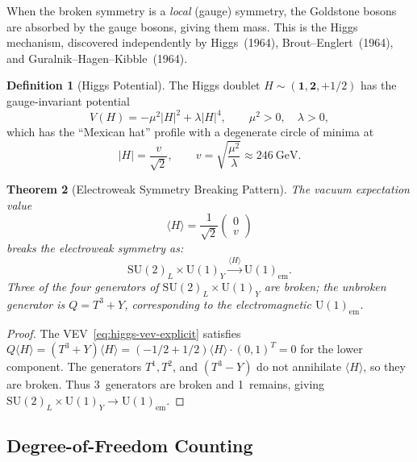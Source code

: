 \documentclass[12pt]{article}
\newtheorem{theorem}{Theorem}[section]
\theoremstyle{definition}
\newtheorem{definition}[theorem]{Definition}
\theoremstyle{remark}
\newcommand{\su}[1]{\mathrm{SU}(#1)}
\newcommand{\uu}[1]{\mathrm{U}(#1)}
\newcommand{\vev}[1]{\langle #1 \rangle}
\begin{document}
When the broken symmetry is a \emph{local} (gauge) symmetry, the Goldstone bosons are absorbed by the gauge bosons, giving them mass. This is the Higgs mechanism, discovered independently by Higgs~(1964), Brout--Englert~(1964), and Guralnik--Hagen--Kibble~(1964).

\begin{definition}[Higgs Potential]
\label{def:higgs-potential}
The Higgs doublet $H \sim (\mathbf{1}, \mathbf{2}, +1/2)$ has the gauge-invariant potential
\begin{equation}
\label{eq:higgs-potential}
V(H) = -\mu^2 |H|^2 + \lambda |H|^4, \qquad \mu^2 > 0, \quad \lambda > 0,
\end{equation}
which has the ``Mexican hat'' profile with a degenerate circle of minima at
\begin{equation}
\label{eq:higgs-vev}
|H| = \frac{v}{\sqrt{2}}, \qquad v = \sqrt{\frac{\mu^2}{\lambda}} \approx 246~\text{GeV}.
\end{equation}
\end{definition}

\begin{theorem}[Electroweak Symmetry Breaking Pattern]
\label{thm:ewsb}
The vacuum expectation value
\begin{equation}
\label{eq:higgs-vev-explicit}
\vev{H} = \frac{1}{\sqrt{2}} \begin{pmatrix} 0 \\ v \end{pmatrix}
\end{equation}
breaks the electroweak symmetry as:
\begin{equation}
\su{2}_L \times \uu{1}_Y \xrightarrow{\vev{H}} \uu{1}_{\mathrm{em}}.
\end{equation}
Three of the four generators of $\su{2}_L \times \uu{1}_Y$ are broken; the unbroken generator is $Q = T^3 + Y$, corresponding to the electromagnetic $\uu{1}_{\mathrm{em}}$.
\end{theorem}

\begin{proof}
The VEV~\eqref{eq:higgs-vev-explicit} satisfies $Q \vev{H} = (T^3 + Y) \vev{H} = (-1/2 + 1/2) \vev{H} \cdot (0, 1)^T = 0$ for the lower component. The generators $T^1, T^2$, and $(T^3 - Y)$ do not annihilate $\vev{H}$, so they are broken. Thus 3~generators are broken and 1~remains, giving $\su{2}_L \times \uu{1}_Y \to \uu{1}_{\mathrm{em}}$.
\end{proof}

\subsection{Degree-of-Freedom Counting}
\end{document}
